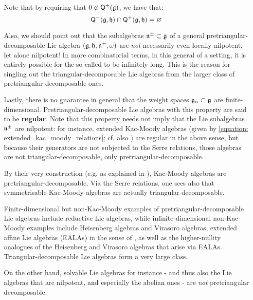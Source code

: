         \begin{remark}
            Note that by requiring that $0 \not \in \mathsf{Q}^{\pm}(\mathfrak{g})$, we have that:
                $$\mathsf{Q}^-(\mathfrak{g}, \mathfrak{h}) \cap \mathsf{Q}^+(\mathfrak{g}, \mathfrak{h}) = \varnothing$$
                
            Also, we should point out that the  subalgebras $\mathfrak{n}^{\pm} \subset \mathfrak{g}$ of a general pretriangular-decomposable Lie algebra $(\mathfrak{g}, \mathfrak{h}, \mathfrak{n}^{\pm}, \omega)$ are \textit{not} necessarily even locally nilpotent, let alone nilpotent! In more combinatorial terms, in this general of a setting, it is entirely possible for the so-called  to be infinitely long. This is the reason for singling out the triangular-decomposable Lie algebras from the larger class of pretriangular-decomposable ones.

            Lastly, there is no guarantee in general that the weight spaces $\mathfrak{g}_{\alpha} \subset \mathfrak{g}$ are finite-dimensional. Pretriangular-decomposable Lie algebras with this property are said to be \textbf{regular}. Note that this property needs not imply that the Lie subalgebras $\mathfrak{n}^{\pm}$ are nilpotent: for instance, extended Kac-Moody algebras (given by \eqref{equation: extended_kac_moody_relations}; cf. also \cite[Theorem 1.2]{kac_infinite_dimensional_lie_algebras}) are regular in the above sense, but because their generators are not subjected to the Serre relations, those algebras are not triangular-decomposable, only pretriangular-decomposable. 
        \end{remark}
        \begin{example}
            By their very construction (e.g. as explained in \cite[Theorem 1.2]{kac_infinite_dimensional_lie_algebras}), Kac-Moody algebras are pretriangular-decomposable. Via the Serre relations, one sees also that symmetrisable Kac-Moody algebras are actually triangular-decomposable.
            
            Finite-dimensional but non-Kac-Moody examples of pretriangular-decomposable Lie algebras include reductive Lie algebras, while infinite-dimensional non-Kac-Moody examples include Heisenberg algebras and Virasoro algebras, extended affine Lie algebras (EALAs) in the sense of \cite{neher_lectures_on_EALAs}, as well as the higher-nullity analogues of the Heisenberg and Virasoro algebras that arise via EALAs. Triangular-decomposable Lie algebras form a very large class.

            On the other hand, solvable Lie algebras for instance - and thus also the Lie algebras that are nilpotent, and especially the abelian ones - are \textit{not} pretriangular decomposable.
        \end{example}

